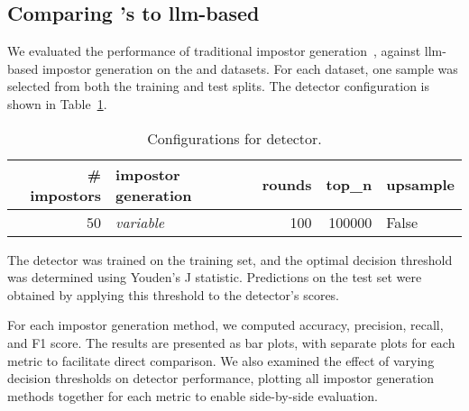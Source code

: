 \subsection{Comparing \citet{koppel_determining_2014}'s to \ac{llm}-based \imps{}}
\label{subsec:imp_gen}

We evaluated the performance of traditional impostor generation~\citep{koppel_determining_2014}, against \ac{llm}-based impostor generation on the \dataBlog{} and \dataStudent{} datasets. 
For each dataset, one sample was selected from both the training and test splits. 
The detector configuration is shown in Table~\ref{tab:imp_gen_comp}.

\begin{table}[h]
\centering\small
\caption{Configurations for detector.}
\label{tab:imp_gen_comp}
\begin{tabular}{@{}rlrrl@{}}   %
\toprule
\# impostors & impostor generation & rounds & top\_n & upsample \\
\midrule
50 & \textit{variable} & 100 & \num{100000} & False \\
\bottomrule
\end{tabular}%
\end{table}

The detector was trained on the training set, and the optimal decision threshold was determined using Youden’s J statistic. 
Predictions on the test set were obtained by applying this threshold to the detector’s scores.

For each impostor generation method, we computed accuracy, precision, recall, and F1 score. 
The results are presented as bar plots, with separate plots for each metric to facilitate direct comparison. 
We also examined the effect of varying decision thresholds on detector performance, plotting all impostor generation methods together for each metric to enable side-by-side evaluation.
